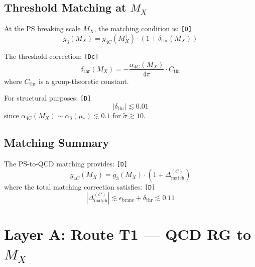 \documentclass[11pt,a4paper]{article}
\newcommand{\tagD}{\textcolor{green!50!black}{\texttt{[D]}}}
\newcommand{\tagDc}{\textcolor{blue!70!black}{\texttt{[Dc]}}}
\theoremstyle{definition}
\begin{document}
\subsection{Threshold Matching at $M_X$}
\label{subsec:threshold-matching}

At the PS breaking scale $M_X$, the matching condition is: \tagD{}
\begin{equation}
\label{eq:threshold-mx}
g_3(M_X^-) = g_{4C}(M_X^+) \cdot (1 + \delta_{\text{thr}}(M_X))
\end{equation}

The threshold correction: \tagDc{}
\begin{equation}
\label{eq:threshold-correction}
\delta_{\text{thr}}(M_X) = -\frac{\alpha_{4C}(M_X)}{4\pi} \cdot C_{\text{thr}}
\end{equation}
where $C_{\text{thr}}$ is a group-theoretic constant.

For structural purposes: \tagD{}
\begin{equation}
\label{eq:threshold-bound}
|\delta_{\text{thr}}| \lesssim 0.01
\end{equation}
since $\alpha_{4C}(M_X) \sim \alpha_3(\mu_*) \lesssim 0.1$ for $\tilde{\sigma} \gtrsim 10$.

\subsection{Matching Summary}
\label{subsec:matching-summary}

\begin{canonbox}
The PS-to-QCD matching provides: \tagD{}
\begin{equation}
\label{eq:matching-summary}
\boxed{g_{4C}(M_X) = g_3(M_X) \cdot (1 + \Delta_{\text{match}}^{(C)})}
\end{equation}
where the total matching correction satisfies: \tagD{}
\begin{equation}
\label{eq:total-match-bound}
|\Delta_{\text{match}}^{(C)}| \lesssim \epsilon_{\text{brane}} + \delta_{\text{thr}} \lesssim 0.11
\end{equation}
\end{canonbox}

\section{Layer A: Route T1 --- QCD RG to $M_X$}
\label{sec:route-t1}
\end{document}
